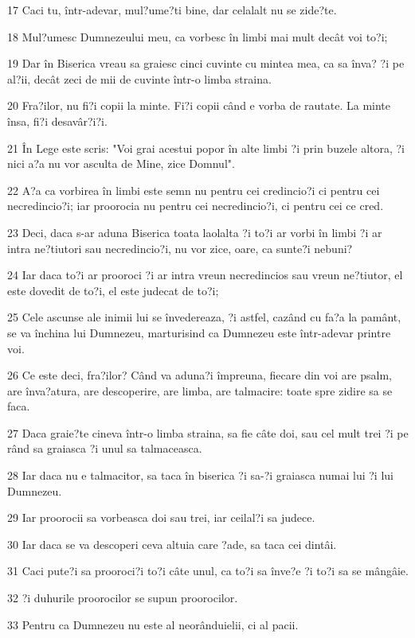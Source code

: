 \par 17 Caci tu, într-adevar, mul?ume?ti bine, dar celalalt nu se zide?te.
\par 18 Mul?umesc Dumnezeului meu, ca vorbesc în limbi mai mult decât voi to?i;
\par 19 Dar în Biserica vreau sa graiesc cinci cuvinte cu mintea mea, ca sa înva? ?i pe al?ii, decât zeci de mii de cuvinte într-o limba straina.
\par 20 Fra?ilor, nu fi?i copii la minte. Fi?i copii când e vorba de rautate. La minte însa, fi?i desavâr?i?i.
\par 21 În Lege este scris: "Voi grai acestui popor în alte limbi ?i prin buzele altora, ?i nici a?a nu vor asculta de Mine, zice Domnul".
\par 22 A?a ca vorbirea în limbi este semn nu pentru cei credincio?i ci pentru cei necredincio?i; iar proorocia nu pentru cei necredincio?i, ci pentru cei ce cred.
\par 23 Deci, daca s-ar aduna Biserica toata laolalta ?i to?i ar vorbi în limbi ?i ar intra ne?tiutori sau necredincio?i, nu vor zice, oare, ca sunte?i nebuni?
\par 24 Iar daca to?i ar prooroci ?i ar intra vreun necredincios sau vreun ne?tiutor, el este dovedit de to?i, el este judecat de to?i;
\par 25 Cele ascunse ale inimii lui se învedereaza, ?i astfel, cazând cu fa?a la pamânt, se va închina lui Dumnezeu, marturisind ca Dumnezeu este într-adevar printre voi.
\par 26 Ce este deci, fra?ilor? Când va aduna?i împreuna, fiecare din voi are psalm, are înva?atura, are descoperire, are limba, are talmacire: toate spre zidire sa se faca.
\par 27 Daca graie?te cineva într-o limba straina, sa fie câte doi, sau cel mult trei ?i pe rând sa graiasca ?i unul sa talmaceasca.
\par 28 Iar daca nu e talmacitor, sa taca în biserica ?i sa-?i graiasca numai lui ?i lui Dumnezeu.
\par 29 Iar proorocii sa vorbeasca doi sau trei, iar ceilal?i sa judece.
\par 30 Iar daca se va descoperi ceva altuia care ?ade, sa taca cei dintâi.
\par 31 Caci pute?i sa prooroci?i to?i câte unul, ca to?i sa înve?e ?i to?i sa se mângâie.
\par 32 ?i duhurile proorocilor se supun proorocilor.
\par 33 Pentru ca Dumnezeu nu este al neorânduielii, ci al pacii.
